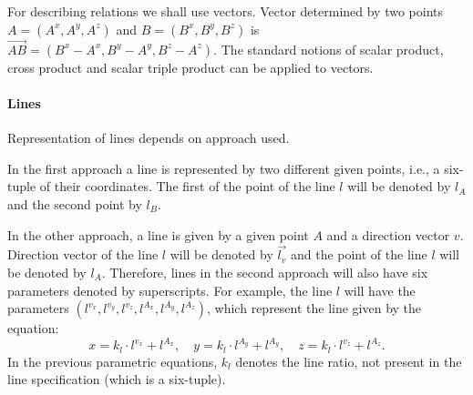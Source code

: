 \documentclass[final,1p,times,authoryear]{elsarticle}
\begin{document}
For describing relations we shall use vectors. Vector determined by
two points $A = (A^x, A^y, A^z)$ and $B = (B^x, B^y, B^z)$ is
$\overrightarrow{AB} = (B^x- A^x, B^y - A^y, B^z - A^z)$. The standard
notions of scalar product, cross product and scalar triple product can
be applied to vectors.


\paragraph{Lines}

Representation of lines depends on approach used.

In the first approach a line is represented by two different given
points, i.e., a six-tuple of their coordinates. The first of the point
of the line $l$ will be denoted by $l_A$ and the second point by
$l_B$.

In the other approach, a line is given by a given point $A$ and a
direction vector $v$. Direction vector of the line $l$ will be denoted
by $\overrightarrow{l_v}$ and the point of the line $l$ will be
denoted by $l_A$. Therefore, lines in the second approach will also
have six parameters denoted by superscripts. For example, the line $l$
will have the parameters $(l^{v_x}, l^{v_y}, l^{v_z}, l^{A_x},
l^{A_y}, l^{A_z})$, which represent the line given by the equation:
$$x = k_l\cdot l^{v_x} + l^{A_x},\quad y = k_l\cdot l^{A_y} +
l^{A_y},\quad z = k_l\cdot l^{v_z} + l^{A_z}.$$
In the previous parametric equations, $k_l$ denotes the line ratio,
not present in the line specification (which is a six-tuple).
\end{document}

